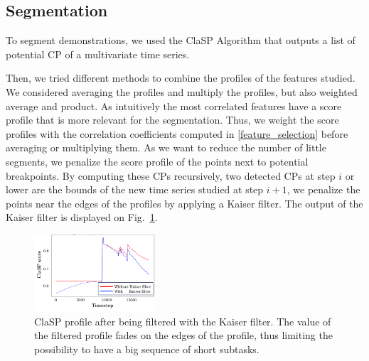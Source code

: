 \documentclass[a4paper, 10pt, conference]{ieeeconf}
\begin{document}

\subsection{Segmentation} \label{method_segmentation}

To segment demonstrations, we used the  ClaSP Algorithm that outputs a list  of potential CP of a multivariate time series. 

Then, we tried different methods to combine the profiles of the features studied. We considered averaging the profiles and multiply the profiles, but also weighted average and product. As intuitively the most correlated features have a score profile that is more relevant for the segmentation. Thus, we weight the score profiles with the correlation coefficients computed in \ref{feature_selection} before averaging or multiplying them. As we want to reduce the number of little segments, we penalize the score profile of the points next to potential breakpoints. By computing these CPs recursively, two detected CPs at step $i$ or lower are the bounds of the new time series studied at step $i+1$, we penalize the points near the edges of the profiles by applying a Kaiser filter. The output of the Kaiser filter is displayed on Fig.~\ref{fig:Kaiser}.

\begin{figure}[t]
  \centering
  \includegraphics[width=0.4\textwidth]{img/resolKaiser.pdf}
  \caption{ClaSP profile after being filtered with the Kaiser filter. The value of the filtered profile fades on the edges of the profile, thus limiting the possibility to have a big sequence of short subtasks.}
  \label{fig:Kaiser}
\end{figure}
\end{document}
